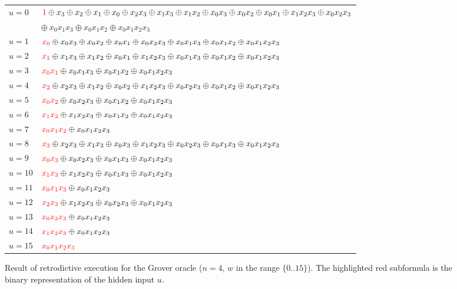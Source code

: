 \documentclass[sigplan,screen]{acmart}
\newcommand{\red}[1]{{\color{red}{#1}}}
\theoremstyle{definition}
\begin{document}
\begin{figure}[t]
\begin{tabular}{ll}
$u=0$ &
  $\red{1} \oplus x_3 \oplus x_2 \oplus x_1 \oplus x_0 \oplus x_2x_3 \oplus x_1x_3 \oplus x_1x_2 \oplus x_0x_3 \oplus x_0x_2 \oplus x_0x_1 \oplus x_1x_2x_3 \oplus x_0x_2x_3$ \\
   &\quad $\oplus ~x_0x_1x_3 \oplus x_0x_1x_2 \oplus x_0x_1x_2x_3$ \\
$u=1$ &
  $\red{x_0} \oplus x_0x_3 \oplus x_0x_2 \oplus x_0x_1 \oplus x_0x_2x_3 \oplus x_0x_1x_3 \oplus x_0x_1x_2 \oplus x_0x_1x_2x_3$ \\
$u=2$ &
  $\red{x_1} \oplus x_1x_3 \oplus x_1x_2 \oplus x_0x_1 \oplus x_1x_2x_3 \oplus x_0x_1x_3 \oplus x_0x_1x_2 \oplus x_0x_1x_2x_3$ \\
$u=3$ &
  $\red{x_0x_1} \oplus x_0x_1x_3 \oplus x_0x_1x_2 \oplus x_0x_1x_2x_3$ \\
$u=4$ &
  $\red{x_2} \oplus x_2x_3 \oplus x_1x_2 \oplus x_0x_2 \oplus x_1x_2x_3 \oplus x_0x_2x_3 \oplus x_0x_1x_2 \oplus x_0x_1x_2x_3$ \\
$u=5$ &
  $\red{x_0x_2} \oplus x_0x_2x_3 \oplus x_0x_1x_2 \oplus x_0x_1x_2x_3$ \\
$u=6$ &
  $\red{x_1x_2} \oplus x_1x_2x_3 \oplus x_0x_1x_2 \oplus x_0x_1x_2x_3$ \\
$u=7$ &
  $\red{x_0x_1x_2} \oplus x_0x_1x_2x_3$ \\
$u=8$ &
  $\red{x_3} \oplus x_2x_3 \oplus x_1x_3 \oplus x_0x_3 \oplus x_1x_2x_3 \oplus x_0x_2x_3 \oplus x_0x_1x_3 \oplus x_0x_1x_2x_3$ \\
$u=9$ &
  $\red{x_0x_3} \oplus x_0x_2x_3 \oplus x_0x_1x_3 \oplus x_0x_1x_2x_3$ \\
$u=10$ &
  $\red{x_1x_3} \oplus x_1x_2x_3 \oplus x_0x_1x_3 \oplus x_0x_1x_2x_3$ \\
$u=11$ &
  $\red{x_0x_1x_3} \oplus x_0x_1x_2x_3$ \\
$u=12$ &
  $\red{x_2x_3} \oplus x_1x_2x_3 \oplus x_0x_2x_3 \oplus x_0x_1x_2x_3$ \\
$u=13$ &
  $\red{x_0x_2x_3} \oplus x_0x_1x_2x_3$ \\
$u=14$ &
  $\red{x_1x_2x_3} \oplus x_0x_1x_2x_3$ \\
$u=15$ &
  $\red{x_0x_1x_2x_3}$
\end{tabular}
\caption{\label{fig:Grover}Result of retrodictive execution for the Grover oracle ($n=4$, $w$ in the range $\{0..15\}$). The highlighted red subformula is the binary representation of the hidden input $u$.}
\end{figure}
\end{document}
